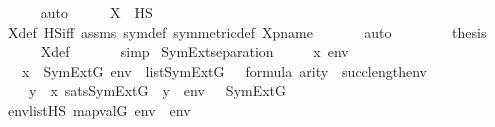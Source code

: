 \begin{isabellebody}
\ \ \ \ \isamarkupfalse%
\ auto\isanewline
\isanewline
\ \ \isamarkupfalse%
\ \isamarkupfalse%
\ {\isachardoublequoteopen}X\ {\isasymin}\ HS{\isachardoublequoteclose}\ \isanewline
\ \ \ \ \isamarkupfalse%
\ X{\isacharunderscore}{\kern0pt}def\ HS{\isacharunderscore}{\kern0pt}iff\ assms\ sym{\isacharunderscore}{\kern0pt}def\ symmetric{\isacharunderscore}{\kern0pt}def\ Xpname\ \isanewline
\ \ \ \ \isamarkupfalse%
\ auto\isanewline
\ \ \isanewline
\ \ \isamarkupfalse%
\ \isamarkupfalse%
\ {\isacharquery}{\kern0pt}thesis\ \isanewline
\ \ \ \ \isamarkupfalse%
\ X{\isacharunderscore}{\kern0pt}def\ \isanewline
\ \ \ \ \isamarkupfalse%
\ simp\isanewline
{}\isamarkupfalse%
%
\endisatagproof
{\isafoldproof}%
%
\isadelimproof
\isanewline
%
\endisadelimproof
\isanewline
{}\isamarkupfalse%
\ SymExt{\isacharunderscore}{\kern0pt}separation\ {\isacharcolon}{\kern0pt}\ \isanewline
\ \ \ x\ env\ {\isasymphi}\ \isanewline
\ \ \ {\isachardoublequoteopen}x\ {\isasymin}\ SymExt{\isacharparenleft}{\kern0pt}G{\isacharparenright}{\kern0pt}{\isachardoublequoteclose}\ {\isachardoublequoteopen}env\ {\isasymin}\ list{\isacharparenleft}{\kern0pt}SymExt{\isacharparenleft}{\kern0pt}G{\isacharparenright}{\kern0pt}{\isacharparenright}{\kern0pt}{\isachardoublequoteclose}\ {\isachardoublequoteopen}{\isasymphi}\ {\isasymin}\ formula{\isachardoublequoteclose}\ {\isachardoublequoteopen}arity{\isacharparenleft}{\kern0pt}{\isasymphi}{\isacharparenright}{\kern0pt}\ {\isasymle}\ succ{\isacharparenleft}{\kern0pt}length{\isacharparenleft}{\kern0pt}env{\isacharparenright}{\kern0pt}{\isacharparenright}{\kern0pt}{\isachardoublequoteclose}\ \isanewline
\ \ \ {\isachardoublequoteopen}{\isacharbraceleft}{\kern0pt}\ y\ {\isasymin}\ x{\isachardot}{\kern0pt}\ sats{\isacharparenleft}{\kern0pt}SymExt{\isacharparenleft}{\kern0pt}G{\isacharparenright}{\kern0pt}{\isacharcomma}{\kern0pt}\ {\isasymphi}{\isacharcomma}{\kern0pt}\ {\isacharbrackleft}{\kern0pt}y{\isacharbrackright}{\kern0pt}\ {\isacharat}{\kern0pt}\ env{\isacharparenright}{\kern0pt}\ {\isacharbraceright}{\kern0pt}\ {\isasymin}\ SymExt{\isacharparenleft}{\kern0pt}G{\isacharparenright}{\kern0pt}{\isachardoublequoteclose}\isanewline
%
\isadelimproof
%
\endisadelimproof
%
\isatagproof
{}\isamarkupfalse%
\ {\isacharminus}{\kern0pt}\ \isanewline
\ \ \isamarkupfalse%
\ {\isachardoublequoteopen}{\isasymexists}env{\isacharprime}{\kern0pt}{\isasymin}list{\isacharparenleft}{\kern0pt}HS{\isacharparenright}{\kern0pt}{\isachardot}{\kern0pt}\ map{\isacharparenleft}{\kern0pt}val{\isacharparenleft}{\kern0pt}G{\isacharparenright}{\kern0pt}{\isacharcomma}{\kern0pt}\ env{\isacharprime}{\kern0pt}{\isacharparenright}{\kern0pt}\ {\isacharequal}{\kern0pt}\ env{\isachardoublequoteclose}\ \isanewline

\end{isabellebody}
